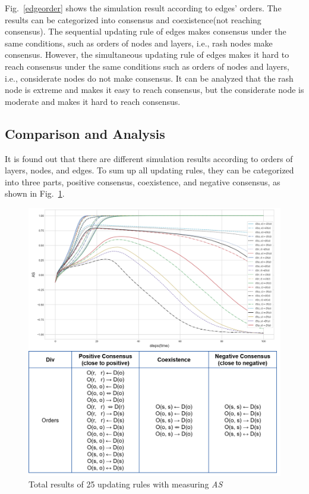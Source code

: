 Fig.~\ref{edgeorder} shows the simulation result according to edges' orders. The results can be categorized into consensus and coexistence(not reaching consensus). The sequential updating rule of edges makes consensus under the same conditions, such as orders of nodes and layers, i.e., rash nodes make consensus. However, the simultaneous updating rule of edges makes it hard to reach consensus under the same conditions such as orders of nodes and layers, i.e., considerate nodes do not make consensus. It can be analyzed that the rash node is extreme and makes it easy to reach consensus, but the considerate node is moderate and makes it hard to reach consensus.\\
 
\subsection{Comparison and Analysis}
It is found out that there are different simulation results according to orders of layers, nodes, and edges. To sum up all updating rules, they can be categorized into three parts, positive consensus, coexistence, and negative consensus, as shown in Fig.~\ref{ordertotal}. 
 
\begin{figure}[!htb]
	\centering
	\includegraphics[width=\hsize]{figure/chap4_ordertotal.png}
	\caption{Total results of 25 updating rules with measuring \textit{AS}}
	\label{ordertotal}
\end{figure}

